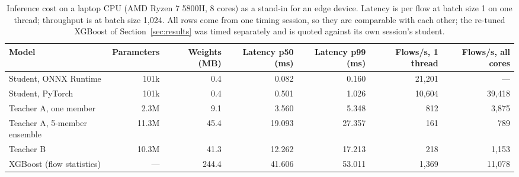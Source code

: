 \begin{table}[t]
\centering
\caption{Inference cost on a laptop CPU (AMD Ryzen 7 5800H, 8 cores) as a stand-in for an edge device. Latency is per flow at batch size 1 on one thread; throughput is at batch size 1,024. All rows come from one timing session, so they are comparable with each other; the re-tuned XGBoost of Section~\ref{sec:results} was timed separately and is quoted against its own session's student.}
\label{tab:cpu}
\begin{tabular}{lrrrrrr}
\toprule
Model & Parameters & Weights (MB) & Latency p50 (ms) & Latency p99 (ms) & Flows/s, 1 thread & Flows/s, all cores \\
\midrule
Student, ONNX Runtime & 101k & 0.4 & 0.082 & 0.160 & 21,201 & --- \\
Student, PyTorch & 101k & 0.4 & 0.501 & 1.026 & 10,604 & 39,418 \\
Teacher A, one member & 2.3M & 9.1 & 3.560 & 5.348 & 812 & 3,875 \\
Teacher A, 5-member ensemble & 11.3M & 45.4 & 19.093 & 27.357 & 161 & 789 \\
Teacher B & 10.3M & 41.3 & 12.262 & 17.213 & 218 & 1,153 \\
XGBoost (flow statistics) & --- & 244.4 & 41.606 & 53.011 & 1,369 & 11,078 \\
\bottomrule
\end{tabular}
\end{table}
